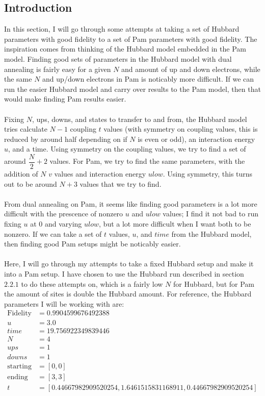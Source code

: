 \subsection{Introduction}
In this section, I will go through some attempts at taking a set of Hubbard parameters with good fidelity to a set of Pam parameters with good fidelity.
The inspiration comes from thinking of the Hubbard model embedded in the Pam model.
Finding good sets of parameters in the Hubbard model with dual annealing is fairly easy for a given $N$ and amount of up and down electrons, while the same $N$ and up/down electrons in Pam is noticably more difficult.
If we can run the easier Hubbard model and carry over results to the Pam model, then that would make finding Pam results easier. \\
\\
Fixing $N$, ups, downs, and states to transfer to and from, the Hubbard model tries calculate $N-1$ coupling $t$ values (with symmetry on coupling values, this is reduced by around half depending on if $N$ is even or odd), an interaction energy $u$, and a time.
Using symmetry on the coupling values, we try to find a set of around $\dfrac{N}{2}+2$ values.
For Pam, we try to find the same parameters, with the addition of $N$ $v$ values and interaction energy $ulow$.
Using symmetry, this turns out to be around $N+3$ values that we try to find. \\
\\
From dual annealing on Pam, it seems like finding good parameters is a lot more difficult with the prescence of nonzero $u$ and $ulow$ values; I find it not bad to run fixing $u$ at $0$ and varying $ulow$, but a lot more difficult when I want both to be nonzero.
If we can take a set of $t$ values, $u$, and $time$ from the Hubbard model, then finding good Pam setups might be noticably easier. \\
\\
Here, I will go through my attempts to take a fixed Hubbard setup and make it into a Pam setup.
I have chosen to use the Hubbard run described in section $2.2.1$ to do these attempts on, which is a fairly low $N$ for Hubbard, but for Pam the amount of sites is double the Hubbard amount.
For reference, the Hubbard parameters I will be working with are:
\begin{align*}
    \text{Fidelity} &= 0.9904599676492388 \\
    u &= 3.0 \\
    time &= 19.756922349839446 \\
    N &= 4 \\
    ups &= 1 \\
    downs &= 1 \\
    \text{starting} &= [0,0]\\
    \text{ending} &=  [3,3] \\
    t &= [0.44667982909520254,1.6461515831168911,0.44667982909520254]
\end{align*}
